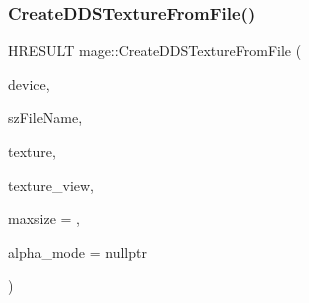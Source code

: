 \subsubsection{\texorpdfstring{Create\+D\+D\+S\+Texture\+From\+File()}{CreateDDSTextureFromFile()}\hspace{0.1cm}{\footnotesize\ttfamily [1/4]}}
{\footnotesize\ttfamily H\+R\+E\+S\+U\+LT mage\+::\+Create\+D\+D\+S\+Texture\+From\+File (\begin{DoxyParamCaption}\item[{\+\_\+\+In\+\_\+ \hyperlink{namespacemage_ae74f374780900893caa5555d1031fd79}{Com\+Ptr}$<$ I\+D3\+D11\+Device2 $>$}]{device,  }\item[{\+\_\+\+In\+\_\+z\+\_\+ const wchar\+\_\+t $\ast$}]{sz\+File\+Name,  }\item[{\+\_\+\+Outptr\+\_\+opt\+\_\+ I\+D3\+D11\+Resource $\ast$$\ast$}]{texture,  }\item[{\+\_\+\+Outptr\+\_\+opt\+\_\+ I\+D3\+D11\+Shader\+Resource\+View $\ast$$\ast$}]{texture\+\_\+view,  }\item[{\+\_\+\+In\+\_\+ size\+\_\+t}]{maxsize = {},  }\item[{\+\_\+\+Out\+\_\+opt\+\_\+ \hyperlink{namespacemage_a0c586a2bad862f4858900ca121ca80c2}{D\+D\+S\+\_\+\+A\+L\+P\+H\+A\+\_\+\+M\+O\+DE} $\ast$}]{alpha\+\_\+mode = {\ttfamily nullptr} }\end{DoxyParamCaption})}

\hypertarget{namespacemage_a7e3edb074eca31d4dc7143ec2b28d3a7}{}\label{namespacemage_a7e3edb074eca31d4dc7143ec2b28d3a7} 
